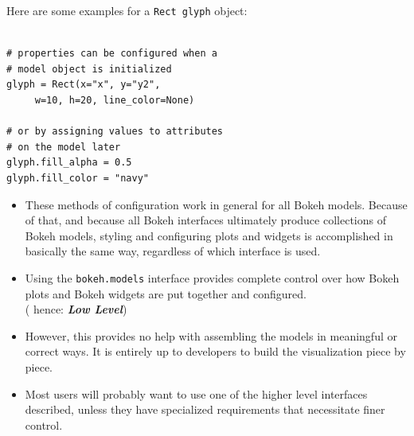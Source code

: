 \documentclass[a4paper,12pt]{article}
\begin{document}
Here are some examples for a \texttt{Rect glyph} object:

\begin{framed}
\begin{verbatim}

# properties can be configured when a 
# model object is initialized
glyph = Rect(x="x", y="y2", 
     w=10, h=20, line_color=None)

# or by assigning values to attributes
# on the model later
glyph.fill_alpha = 0.5
glyph.fill_color = "navy"
\end{verbatim}
\end{framed}
\newpage
\begin{itemize}
\item These methods of configuration work in general for all Bokeh models. Because of that, and because all Bokeh interfaces ultimately produce collections of Bokeh models, styling and configuring plots and widgets is accomplished in basically the same way, regardless of which interface is used.

\item Using the \texttt{bokeh.models} interface provides complete control over how Bokeh plots and Bokeh widgets are put together and configured.\\ ( hence:  \textbf{\textit{Low Level}}) 
\item However, this provides no help with assembling the models in meaningful or correct ways. It is entirely up to developers to build the visualization piece by piece.

\item Most users will probably want to use one of the higher level interfaces described, unless they have specialized requirements that necessitate finer control. 
\end{itemize}
\newpage
\end{document}
